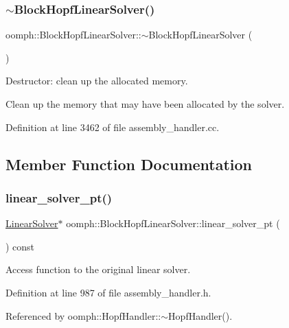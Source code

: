 \subsubsection{\texorpdfstring{$\sim$\+Block\+Hopf\+Linear\+Solver()}{~BlockHopfLinearSolver()}}
{\footnotesize\ttfamily oomph\+::\+Block\+Hopf\+Linear\+Solver\+::$\sim$\+Block\+Hopf\+Linear\+Solver (\begin{DoxyParamCaption}{ }\end{DoxyParamCaption})}



Destructor\+: clean up the allocated memory. 

Clean up the memory that may have been allocated by the solver. 

Definition at line 3462 of file assembly\+\_\+handler.\+cc.



\subsection{Member Function Documentation}
\mbox{\label{classoomph_1_1BlockHopfLinearSolver_ada05d83bb3b4b1024dd19bf07d4374eb}} 
\subsubsection{\texorpdfstring{linear\+\_\+solver\+\_\+pt()}{linear\_solver\_pt()}}
{\footnotesize\ttfamily \hyperlink{classoomph_1_1LinearSolver}{Linear\+Solver}$\ast$ oomph\+::\+Block\+Hopf\+Linear\+Solver\+::linear\+\_\+solver\+\_\+pt (\begin{DoxyParamCaption}{ }\end{DoxyParamCaption}) const\hspace{0.3cm}{\ttfamily [inline]}}



Access function to the original linear solver. 



Definition at line 987 of file assembly\+\_\+handler.\+h.



Referenced by oomph\+::\+Hopf\+Handler\+::$\sim$\+Hopf\+Handler().

